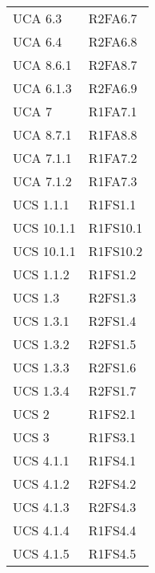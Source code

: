 {\begin{longtable}{ C{4cm} C{4cm}}
UCA 6.3 & R2FA6.7\\

UCA 6.4 & R2FA6.8\\


UCA 8.6.1 & R2FA8.7\\

UCA 6.1.3 & R2FA6.9\\

UCA 7 & R1FA7.1\\

UCA 8.7.1 & R1FA8.8\\

UCA 7.1.1 & R1FA7.2\\

UCA 7.1.2 & R1FA7.3\\

UCS 1.1.1 & R1FS1.1\\

UCS 10.1.1 & R1FS10.1\\


UCS 10.1.1 & R1FS10.2\\

UCS 1.1.2 & R1FS1.2\\

UCS 1.3 & R2FS1.3\\

UCS 1.3.1 & R2FS1.4\\

UCS 1.3.2 & R2FS1.5\\

UCS 1.3.3 & R2FS1.6\\

UCS 1.3.4 & R2FS1.7\\

UCS 2 & R1FS2.1\\

UCS 3 & R1FS3.1\\


UCS 4.1.1 & R1FS4.1\\

UCS 4.1.2 & R2FS4.2\\

UCS 4.1.3 & R2FS4.3\\

UCS 4.1.4 & R1FS4.4\\

UCS 4.1.5 & R1FS4.5\\



\end{longtable}}
